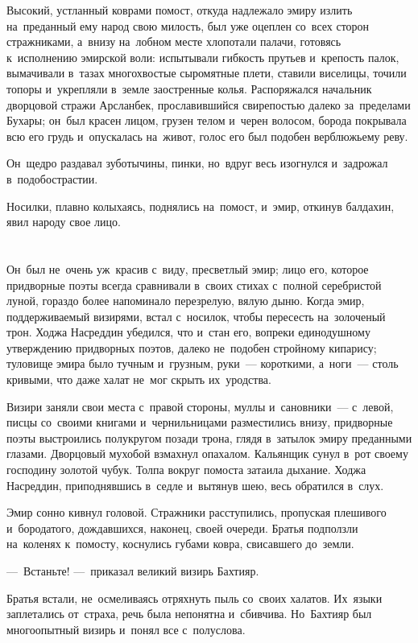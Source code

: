\documentclass[12pt,a4paper]{book}
\begin{document}
Высокий, устланный коврами помост, откуда надлежало эмиру излить на~преданный ему народ свою милость, был уже оцеплен со~всех сторон стражниками, а~внизу на~лобном месте хлопотали палачи, готовясь к~исполнению эмирской воли: испытывали гибкость прутьев и~крепость палок, вымачивали в~тазах многохвостые сыромятные плети, ставили виселицы, точили топоры и~укрепляли в~земле заостренные колья. Распоряжался начальник дворцовой стражи Арсланбек, прославившийся свирепостью далеко за~пределами Бухары; он~был красен лицом, грузен телом и~черен волосом, борода покрывала всю его грудь и~опускалась на~живот, голос его был подобен верблюжьему реву.

Он~щедро раздавал зуботычины, пинки, но~вдруг весь изогнулся и~задрожал в~подобострастии.

Носилки, плавно колыхаясь, поднялись на~помост, и~эмир, откинув балдахин, явил народу свое лицо.


\chapter{}

Он~был не~очень уж~красив с~виду, пресветлый эмир; лицо его, которое придворные поэты всегда сравнивали в~своих стихах с~полной серебристой луной, гораздо более напоминало перезрелую, вялую дыню. Когда эмир, поддерживаемый визирями, встал с~носилок, чтобы пересесть на~золоченый трон. Ходжа Насреддин убедился, что и~стан его, вопреки единодушному утверждению придворных поэтов, далеко не~подобен стройному кипарису; туловище эмира было тучным и~грузным, руки~— короткими, а~ноги~— столь кривыми, что даже халат не~мог скрыть их~уродства.

Визири заняли свои места с~правой стороны, муллы и~сановники~— с~левой, писцы со~своими книгами и~чернильницами разместились внизу, придворные поэты выстроились полукругом позади трона, глядя в~затылок эмиру преданными глазами. Дворцовый мухобой взмахнул опахалом. Кальянщик сунул в~рот своему господину золотой чубук. Толпа вокруг помоста затаила дыхание. Ходжа Насреддин, приподнявшись в~седле и~вытянув шею, весь обратился в~слух.

Эмир сонно кивнул головой. Стражники расступились, пропуская плешивого и~бородатого, дождавшихся, наконец, своей очереди. Братья подползли на~коленях к~помосту, коснулись губами ковра, свисавшего до~земли.

—~Встаньте! —~приказал великий визирь Бахтияр.

Братья встали, не~осмеливаясь отряхнуть пыль со~своих халатов. Их~языки заплетались от~страха, речь была непонятна и~сбивчива. Но~Бахтияр был многоопытный визирь и~понял все с~полуслова.
\end{document}
